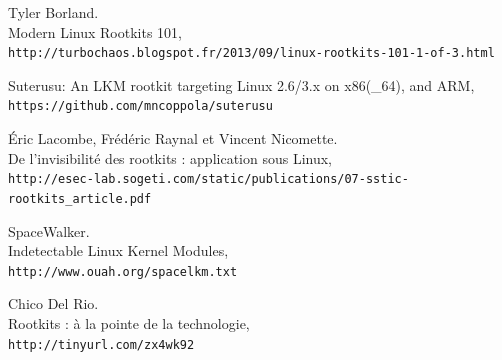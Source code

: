 \documentclass[11pt]{article}
\begin{document}
\begin{thebibliography}{9}

Tyler Borland.\\
Modern Linux Rootkits 101,
\\\texttt{http://turbochaos.blogspot.fr/2013/09/linux-rootkits-101-1-of-3.html}

Suterusu: An LKM rootkit targeting Linux 2.6/3.x on x86(\_64), and ARM,
\\\texttt{https://github.com/mncoppola/suterusu}

Éric Lacombe, Frédéric Raynal et Vincent Nicomette.\\
De l’invisibilité des rootkits : application sous Linux,
\\\texttt{http://esec-lab.sogeti.com/static/publications/07-sstic-rootkits\_article.pdf}

SpaceWalker.\\
Indetectable Linux Kernel Modules,
\\\texttt{http://www.ouah.org/spacelkm.txt}

Chico Del Rio.\\
Rootkits : à la pointe de la technologie,
\\\texttt{http://tinyurl.com/zx4wk92}



\end{thebibliography}
\end{document}
